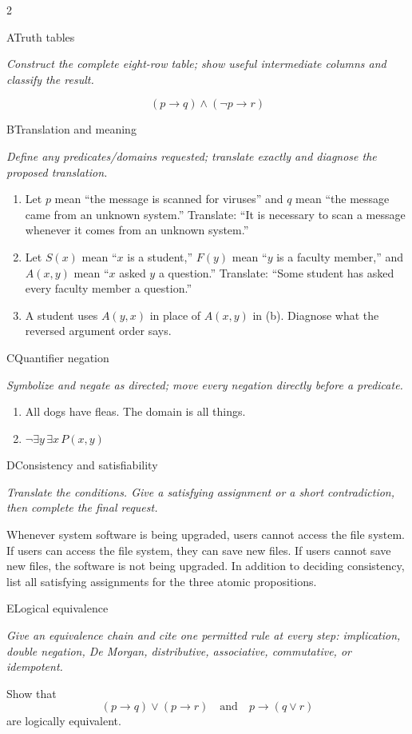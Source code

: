 \documentclass[9pt]{extarticle}
\begin{document}
\CoreWorkArea
\FormBreak
{}
\begin{multicols}{2}
\begin{CoreProblem}{A}{Truth tables}
{\scriptsize\textit{Construct the complete eight-row table; show useful intermediate columns and classify the result.}\par}
\[
  (p\to q)\land(\neg p\to r)
\]
\end{CoreProblem}
\begin{CoreProblem}{B}{Translation and meaning}
{\scriptsize\textit{Define any predicates/domains requested; translate exactly and diagnose the proposed translation.}\par}
\begin{enumerate}[label=(\alph*)]
  \item Let $p$ mean ``the message is scanned for viruses'' and $q$ mean ``the
        message came from an unknown system.'' Translate: ``It is necessary to
        scan a message whenever it comes from an unknown system.''
  \item Let $S(x)$ mean ``$x$ is a student,'' $F(y)$ mean ``$y$ is a faculty
        member,'' and $A(x,y)$ mean ``$x$ asked $y$ a question.'' Translate:
        ``Some student has asked every faculty member a question.''
  \item A student uses $A(y,x)$ in place of $A(x,y)$ in (b). Diagnose what the
        reversed argument order says.
\end{enumerate}
\end{CoreProblem}
\begin{CoreProblem}{C}{Quantifier negation}
{\scriptsize\textit{Symbolize and negate as directed; move every negation directly before a predicate.}\par}
\begin{enumerate}[label=(\alph*)]
  \item All dogs have fleas. The domain is all things.
  \item $\neg\exists y\,\exists x\,P(x,y)$
\end{enumerate}
\end{CoreProblem}
\columnbreak
\begin{CoreProblem}{D}{Consistency and satisfiability}
{\scriptsize\textit{Translate the conditions. Give a satisfying assignment or a short contradiction, then complete the final request.}\par}
Whenever system software is being upgraded, users cannot access the file
system. If users can access the file system, they can save new files. If users
cannot save new files, the software is not being upgraded. In addition to
deciding consistency, list all satisfying assignments for the three atomic
propositions.
\end{CoreProblem}
\begin{CoreProblem}{E}{Logical equivalence}
{\scriptsize\textit{Give an equivalence chain and cite one permitted rule at every step: implication, double negation, De Morgan, distributive, associative, commutative, or idempotent.}\par}
Show that
\[
  (p\to q)\lor(p\to r)
  \quad\text{and}\quad
  p\to(q\lor r)
\]
are logically equivalent.
\end{CoreProblem}
\end{multicols}
\end{document}
